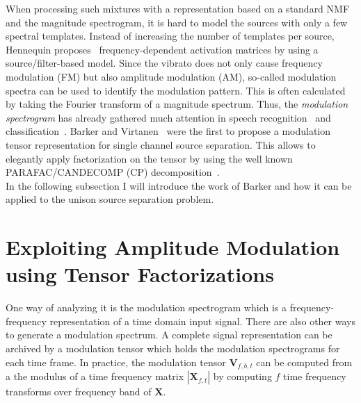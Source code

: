 {{%
When processing such mixtures with a representation based on a standard NMF and the magnitude spectrogram, it is hard to model the sources with only a few spectral templates. Instead of increasing the number of templates per source, Hennequin proposes~\cite{hennequin11} frequency-dependent activation matrices by using a source/filter-based model.
Since the vibrato does not only cause frequency modulation (FM) but also amplitude modulation (AM), so-called modulation spectra can be used to identify the modulation pattern. This is often calculated by taking the Fourier transform of a magnitude spectrum. Thus, the \emph{modulation spectrogram} has already gathered much attention in speech recognition~\cite{greenberg97,kingsbury98} and classification~\cite{kinnunen08, markaki09}.
Barker and Virtanen~\cite{barker13} were the first to propose a modulation tensor representation for single channel source separation. This allows to elegantly apply factorization on the tensor by using the well known PARAFAC/CANDECOMP (CP) decomposition~\cite{cichocki09}.\\

In the following subsection I will introduce the work of Barker and how it can be applied to the unison source separation problem.

\section{Exploiting Amplitude Modulation using Tensor Factorizations}
\label{sub:am}


One way of analyzing it is the modulation spectrogram which is a frequency-frequency representation of a time domain input signal.
There are also other ways to generate a modulation spectrum.
A complete signal representation can be archived by a modulation tensor which holds the modulation spectrograms for each time frame.
In practice, the modulation tensor \(\mathbf{V}_{f, b, t}\) can be computed from a the modulus of a time frequency matrix \(| \mathbf{X}_{f, t} |\) by computing \(f\) time frequency transforms over frequency band of \(\mathbf{X}\).


}}
